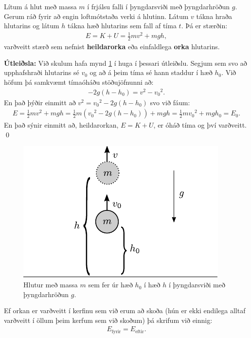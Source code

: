 \begin{tcolorbox}
\begin{theorem}
Lítum á hlut með massa $m$ í frjálsu falli í þyngdarsviði með þyngdarhröðun $g$. Gerum ráð fyrir að engin loftmótstaða verki á hlutinn. Látum $v$ tákna hraða hlutarins og látum $h$ tákna hæð hlutarins sem fall af tíma $t$. Þá er stærðin: 
\begin{align*}
    E = K + U = \frac{1}{2}mv^2 + mgh,
\end{align*}
varðveitt stærð sem nefnist \textbf{heildarorka} eða einfaldlega \textbf{orka} hlutarins.
\end{theorem}
\end{tcolorbox}

\textbf{Útleiðsla:} Við skulum hafa mynd \ref{fig:stoduorka} í huga í þessari útleiðslu. Segjum sem svo að upphafshraði hlutarins sé $v_0$ og að á þeim tíma sé hann staddur í hæð $h_0$. Við höfum þá samkvæmt tímaóháðu stöðujöfnunni að:
\begin{align*}
    -2g(h-h_0) = v^2 - {v_0}^2.
\end{align*}
En það þýðir einmitt að $v^2 = {v_0}^2 - 2g(h-h_0)$ svo við fáum:
\begin{align*}
    E = \frac{1}{2}mv^2 + mgh = \frac{1}{2}m\left( {v_0}^2 -2g(h-h_0) \right) + mgh = \frac{1}{2}m{v_0}^2 + mgh_0 = E_0.
\end{align*}
En það sýnir einmitt að, heildarorkan, $E = K + U$, er óháð tíma og því varðveitt. \qed

\begin{figure}[H]
    \centering
    \includegraphics{figures/stoduorka.pdf}
    \caption{Hlutur með massa $m$ sem fer úr hæð $h_0$ í hæð $h$ í þyngdarsviði með þyngdarhröðun $g$.}
    \label{fig:stoduorka}
\end{figure}

Ef orkan er varðveitt í kerfinu sem við erum að skoða (hún er ekki endilega alltaf varðveitt í öllum þeim kerfum sem við skoðum) þá skrifum við einnig:
\begin{align*}
    E_{\text{fyrir}} = E_{\text{eftir}}.
\end{align*}

